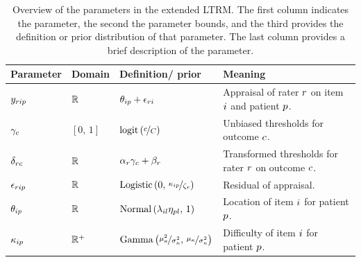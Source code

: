 \documentclass[a4paper,usenames,dvipsnames]{article}
\newenvironment{revision}{\color{teal}}{\color{black}}
\begin{document}
\begin{revision}
	
	\begin{table}[!ht]
		
		\centering
		\caption{\begin{revision}Overview of the parameters in the extended LTRM. The first column indicates the parameter, the second the parameter bounds, and the third provides the definition or prior distribution of that parameter. The last column provides a brief description of the parameter.\end{revision}}%
		
		\label{tb:ExtendedLTRMparameterOverview}
		
		\begin{tabular}{llll}
			
			\toprule
			
			Parameter & Domain & Definition/ prior & Meaning\\
			
			\midrule
			
			$y_{rip}		$&$	\mathbb{R}			$&$\theta_{ip} + \epsilon_{ri}$&
			\makecell[l]{Appraisal of rater $r$\\on item $i$ and patient $p$.}\\
			
			$\gamma_c 					$&$	[0,\,1]			$&$\logit{\nicefrac{\Incat}{\Tncat}}$&
			\makecell[l]{Unbiased thresholds for\\outcome $c$.}\\
			
			$\delta_{rc} 				$&$	\mathbb{R}			$&$\alpha_r \gamma_c + \beta_r$&
			\makecell[l]{Transformed thresholds\\for rater $r$ on outcome $c$.}\\
			
			$\epsilon_{rip}   			$&$	\mathbb{R}			$&$\text{Logistic}\left(0,\,\nicefrac{\kappa_{ip}}{\zeta_r}\right) $&
			Residual of appraisal.\\
			
			$\theta_{ip}      			$&$	\mathbb{R}			$&$\text{Normal}\left(\lambda_{il}\eta_{pl},\,1\right)$&
			\makecell[l]{Location of item $i$\\for patient $p$.}\\
			
			$\kappa_{ip}   		$&$	\mathbb{R}^+	$&$\text{Gamma}\left(\nicefrac{\mu_\kappa^2}{\sigma_\kappa^2},\,\nicefrac{\mu_\kappa}{\sigma_\kappa^2}\right) $&
			\makecell[l]{Difficulty of item $i$\\ for patient $p$.}\\
			

\end{tabular}
\end{table}
\end{revision}
\end{document}

